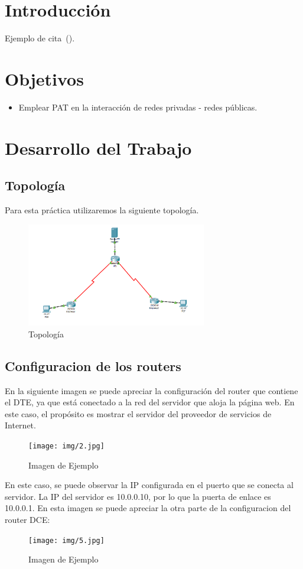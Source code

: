 \setcounter{page}{1}

\section{Introducción}
    Ejemplo de cita~(\cite{buffett84}).
\section{Objetivos}
    \begin{itemize}
        \item Emplear PAT en la interacción de redes privadas - redes públicas.
    \end{itemize}

\section{Desarrollo del Trabajo}
    \subsection{Topología}
    Para esta práctica utilizaremos la siguiente topología.
    \begin{figure}[H]
        \centering
        \includegraphics[width=0.7\textwidth]{img/Topologia.png}
        \caption{Topología}
        \label{fig:topologia}
    \end{figure}
    
    \subsection{Configuracion de los routers}
    En la siguiente imagen se puede apreciar la configuración del router que contiene el DTE, ya que está conectado a la red del servidor que aloja la página web. En este caso, el propósito es mostrar el servidor del proveedor de servicios de Internet.
    \begin{figure}[H]
        \centering
        \texttt{[image: img/2.jpg]}
        \caption{Imagen de Ejemplo}
        \label{fig:Imagen_Ejemplo2}
    \end{figure}
    En este caso, se puede observar la IP configurada en el puerto que se conecta al servidor. La IP del servidor es 10.0.0.10, por lo que la puerta de enlace es 10.0.0.1.
    En esta imagen se puede apreciar la otra parte de la configuracion del router DCE:
    \begin{figure}[H]
        \centering
        \texttt{[image: img/5.jpg]}
        \caption{Imagen de Ejemplo}
        \label{fig:Imagen_Ejemplo5}
    \end{figure}


